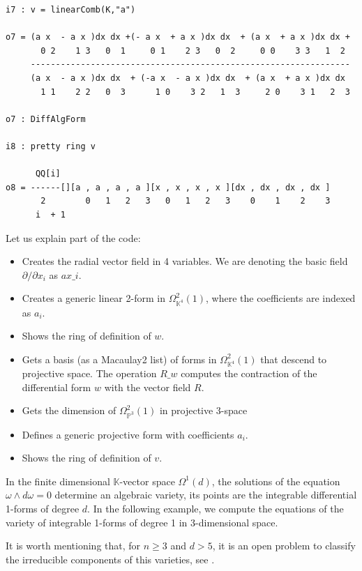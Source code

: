 \documentclass{amsart}
\theoremstyle{definition}
\def\KK{\mathbb{K}}
\def\PP{\mathbb{P}}
\begin{document}
{\begin{lstlisting}
i7 : v = linearComb(K,"a")

o7 = (a x  - a x )dx dx +(- a x  + a x )dx dx  + (a x  + a x )dx dx +
       0 2    1 3   0  1     0 1    2 3   0  2     0 0    3 3   1  2
     ----------------------------------------------------------------
     (a x  - a x )dx dx  + (-a x  - a x )dx dx  + (a x  + a x )dx dx
       1 1    2 2   0  3      1 0    3 2   1  3     2 0    3 1   2  3

o7 : DiffAlgForm

i8 : pretty ring v

      QQ[i]
o8 = ------[][a , a , a , a ][x , x , x , x ][dx , dx , dx , dx ]
       2        0   1   2   3   0   1   2   3    0    1    2    3
      i  + 1
\end{lstlisting}
}

\noindent Let us explain part of the code:
\begin{itemize}
\item[\tt i2.]
Creates the radial vector field in 4 variables. We are 
denoting the basic field ${\partial}/{\partial x_i}$ as $ax\_i$.
\item[\tt i3.]
Creates a generic linear 2-form in $\Omega^2_{\KK^4}(1)$, where the coefficients 
are indexed as $a_i$.
\item[\tt i4.]
Shows the ring of definition of $w$.
\item[\tt i5.]
Gets a basis (as a Macaulay2 list) of forms in $\Omega^2_{\KK^4}(1)$ that 
descend to projective space. The operation $R \_ w$ computes the 
contraction of the differential form $w$ with the vector field $R$.
\item[\tt i6.]
Gets the dimension of $\Omega^2_{\PP^3}(1)$ in projective 3-space
\item[\tt i7.]
Defines a generic projective form with coefficients $a_i$.
\item[\tt i8.]
Shows the ring of definition of $v$.
\end{itemize}


\bigskip

\ex\label{ex2} In the finite dimensional $\KK$-vector space $\Omega^1(d)$, the solutions of the equation $\omega\wedge d\omega=0$ determine an algebraic variety, its points are the integrable differential 1-forms of degree $d$.  In the following example, we compute the equations of the variety of integrable 1-forms of degree 1 in 3-dimensional space.

It is worth mentioning that, for $n\geq 3$ and $d>5$, it is an open problem to classify the irreducible components of this varieties, see \cite{fji}.
\end{document}
